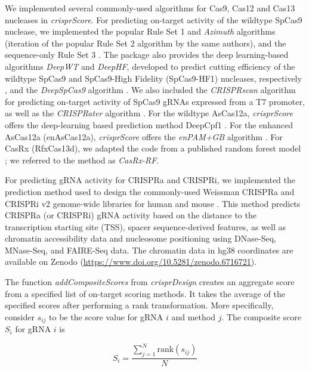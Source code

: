 \documentclass[pdftex,english,10pt]{article}
\begin{document}
We implemented several commonly-used algorithms for Cas9, Cas12 and Cas13 nucleases in \textit{crisprScore}.
For predicting on-target activity of the wildtype SpCas9 nuclease, we implemented the popular Rule Set 1 \citep{doench2014rational} and \textit{Azimuth} algorithms \citep{azimuth} (iteration of the popular Rule Set 2 algorithm by the same authors), and the sequence-only Rule Set 3 \citep{ruleset3}. The package also provides the deep learning-based algorithms \textit{DeepWT} and \textit{DeepHF}, developed to predict cutting efficiency of the wildtype SpCas9 and SpCas9-High Fidelity (SpCas9-HF1) nucleases, respectively \citep{deepcas9}, and the \textit{DeepSpCas9} algorithm \citep{deepspcas9}. We also included the \textit{CRISPRscan} algorithm \citep{crisprscan} for predicting on-target activity of SpCas9 gRNAs expressed from a T7 promoter, as well as the \textit{CRISPRater} algorithm \citep{crisprater}. For the wildtype AsCas12a, \textit{crisprScore} offers the deep-learning based prediction method DeepCpf1 \citep{deepcpf1}. For the enhanced AsCas12a (enAsCas12a), \textit{crisprScore} offers the \textit{enPAM+GB} algorithm \citep{enpamgb}. For CasRx (RfxCas13d), we adapted the code from a published random forest model \citep{wessels2020massively}; we referred to the method as \textit{CasRx-RF}.

For predicting gRNA activity for CRISPRa and CRISPRi, we implemented the prediction method used to design the commonly-used Weissman CRISPRa and CRISPRi v2 genome-wide libraries for human and mouse \citep{crispria}.
This method predicts CRISPRa (or CRISPRi) gRNA activity based on the distance to the transcription starting site (TSS), spacer sequence-derived features, as well as chromatin accessibility data and nucleosome positioning using DNase-Seq, MNase-Seq, and FAIRE-Seq data. The chromatin data in hg38 coordinates are available on Zenodo (\url{https://www.doi.org/10.5281/zenodo.6716721}).

The function \textit{addCompositeScores} from \textit{crisprDesign} creates an aggregate score from a specified list of on-target scoring methods. It takes the average of the specified scores after performing a rank transformation. More specifically, consider $s_{ij}$ to be the score value for gRNA $i$ and method $j$. The composite score $S_{i}$ for gRNA $i$ is

\begin{equation}
S_{i} = \frac{\sum_{j = 1}^N \text{rank}(s_{ij})}{N}
\end{equation}
\end{document}
